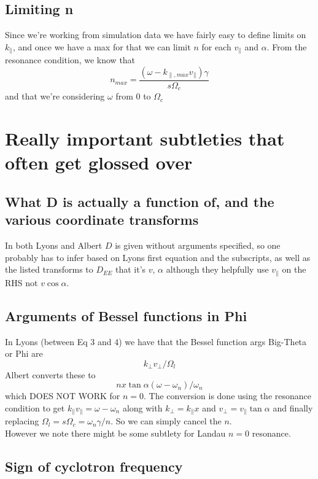 \documentclass[]{article}
\begin{document}
\subsection{Limiting n}
Since we're working from simulation data we have fairly easy to define limits on $k_\parallel$, and once we have a max for that we can limit $n$ for each $v_\parallel$ and $\alpha$. From the resonance condition, we know that 
\[ n_{max} = \frac{(\omega - k_{\parallel, max} v_\parallel)\gamma}{s \Omega_c} \] and that we're considering $\omega$ from 0 to $\Omega_c$



\section{Really important subtleties that often get glossed over}

\subsection{What D is actually a function of, and the various coordinate transforms}

In both Lyons and Albert $D$ is given without arguments specified, so one probably has to infer based on Lyons  first equation and the subscripts, as well as the listed transforms to $D_{EE}$ that it's $ v$, $\alpha$ although they helpfully use $v_\parallel$ on the RHS not $v \cos\alpha$. 


\subsection{Arguments of Bessel functions in Phi}
In Lyons (between Eq 3 and 4) we have that the Bessel function args Big-Theta or Phi are
\[ k_\perp v_\perp / \Omega_l\]
Albert converts these to 
\[ n x \tan \alpha (\omega -\omega_n)/\omega_n\] which DOES NOT WORK for $n = 0$. The conversion is done using the resonance condition to get $k_\parallel v_\parallel = \omega -\omega_n$ along with $k_\perp = k_\parallel x$ and $v_\perp = v_\parallel \tan\alpha$ and finally replacing $\Omega_l = s \Omega_c = \omega_n \gamma / n$. So we can simply cancel the $n$.
\\However we note there might be some subtlety for Landau $n=0$ resonance. 

\subsection{Sign of cyclotron frequency}
\end{document}
